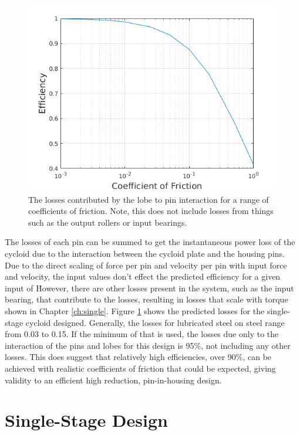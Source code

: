 \begin{figure}[h]
	\centering
	\includegraphics[width=0.75\linewidth]{fig/single_stage_loss}
   \caption{The losses contributed by the lobe to pin interaction for a range of coefficients of friction. Note, this does not include losses from things such as the output rollers or input bearings.}
   \label{fig:single_stage_losses}
\end{figure}



The losses of each pin can be summed to get the instantaneous power loss of the cycloid due to the interaction between the cycloid plate and the housing pins. Due to the direct scaling of force per pin and velocity per pin with input force and velocity, the input values don't effect the predicted efficiency for a given input of \textmu\. However, there are other losses present in the system, such as the input bearing, that contribute to the losses, resulting in losses that scale with torque shown in Chapter \ref{ch:single}. Figure \ref{fig:single_stage_losses} shows the predicted losses for the single-stage cycloid designed. Generally, the losses for lubricated steel on steel range from 0.03 to 0.15. If the minimum of that is used, the losses due only to the interaction of the pins and lobes for this design is 95\%, not including any other losses. This does suggest that relatively high efficiencies, over 90\%, can be achieved with realistic coefficients of friction that could be expected, giving validity to an efficient high reduction, pin-in-housing design. 

\section{Single-Stage Design} \label{ch:design:single}

